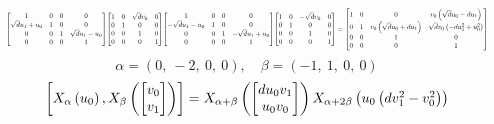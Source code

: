\documentclass[11pt]{article}
\theoremstyle{definition}
\begin{document}
\[
\scaletoalign{\textwidth}{{\left[\begin{matrix}1 & 0 & 0 & 0\\\sqrt{d} u_{1} + u_{0} & 1 & 0 & 0\\0 & 0 & 1 & \sqrt{d} u_{1} - u_{0}\\0 & 0 & 0 & 1\end{matrix}\right]} {\left[\begin{matrix}1 & 0 & \sqrt{d} v_{0} & 0\\0 & 1 & 0 & 0\\0 & 0 & 1 & 0\\0 & 0 & 0 & 1\end{matrix}\right]} {\left[\begin{matrix}1 & 0 & 0 & 0\\- \sqrt{d} u_{1} - u_{0} & 1 & 0 & 0\\0 & 0 & 1 & - \sqrt{d} u_{1} + u_{0}\\0 & 0 & 0 & 1\end{matrix}\right]} {\left[\begin{matrix}1 & 0 & - \sqrt{d} v_{0} & 0\\0 & 1 & 0 & 0\\0 & 0 & 1 & 0\\0 & 0 & 0 & 1\end{matrix}\right]} = {\left[\begin{matrix}1 & 0 & 0 & v_{0} \left(\sqrt{d} u_{0} - d u_{1}\right)\\0 & 1 & v_{0} \left(\sqrt{d} u_{0} + d u_{1}\right) & \sqrt{d} v_{0} \left(- d u_{1}^{2} + u_{0}^{2}\right)\\0 & 0 & 1 & 0\\0 & 0 & 0 & 1\end{matrix}\right]}}
\]
\[
\alpha = \left( 0, \  -2, \  0, \  0\right), \quad \beta = \left( -1, \  1, \  0, \  0\right)
\]
\[
\scaletoalign{\textwidth}{\left[ X_{\alpha}\left(u_{0}\right), X_{\beta}\left(\left[\begin{matrix}v_{0}\\v_{1}\end{matrix}\right]\right) \right] = X_{\alpha + \beta}\left(\left[\begin{matrix}d u_{0} v_{1}\\u_{0} v_{0}\end{matrix}\right]\right) X_{\alpha + 2\beta}\left(u_{0} \left(d v_{1}^{2} - v_{0}^{2}\right)\right)}
\]
\end{document}

